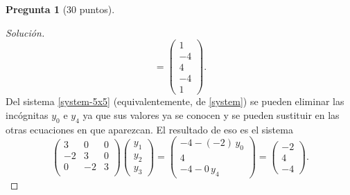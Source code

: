 \documentclass[letterpaper,12pt]{article}
\theoremstyle{definition}
\newtheorem{question}{Pregunta}
\numberwithin{equation}{question}
\newenvironment{solution}{\begin{proof}[Solución]}{\end{proof}}
\begin{document}
\begin{question}[30 puntos]
\begin{solution}
\begin{equation}
= \begin{pmatrix}
1 \\ -4 \\ 4 \\ -4 \\ 1
\end{pmatrix}.
\end{equation}
%
Del sistema \eqref{system-5x5} (equivalentemente, de \eqref{system}) se pueden eliminar las incógnitas $y_0$ e $y_4$ ya que sus valores ya se conocen y se pueden sustituir en las otras ecuaciones en que aparezcan.
El resultado de eso es el sistema
%
\begin{equation}\label{system-3x3}
\begin{pmatrix}
3 & 0 & 0\\
-2 & 3 & 0\\
0 & -2 & 3\\
\end{pmatrix}
\begin{pmatrix}
y_1 \\ y_2 \\ y_3
\end{pmatrix}
= \begin{pmatrix}
-4 - (-2) \, y_0 \\ 4 \\ -4 - 0 \, y_4
\end{pmatrix}
= \begin{pmatrix}
-2 \\ 4 \\ -4
\end{pmatrix}.
\end{equation}
%


\end{solution}
\end{question}
\end{document}
